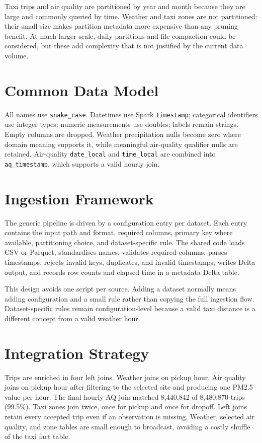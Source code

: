 \documentclass[11pt]{article}
\begin{document}
Taxi trips and air quality are partitioned by year and month because they are large and commonly queried by time. Weather and taxi zones are not partitioned: their small size makes partition metadata more expensive than any pruning benefit. At much larger scale, daily partitions and file compaction could be considered, but these add complexity that is not justified by the current data volume.

\section{Common Data Model}
All names use \texttt{snake\_case}. Datetimes use Spark \texttt{timestamp}; categorical identifiers use integer types; numeric measurements use doubles; labels remain strings. Empty columns are dropped. Weather precipitation nulls become zero where domain meaning supports it, while meaningful air-quality qualifier nulls are retained. Air-quality \texttt{date\_local} and \texttt{time\_local} are combined into \texttt{aq\_timestamp}, which supports a valid hourly join.

\section{Ingestion Framework}
The generic pipeline is driven by a configuration entry per dataset. Each entry contains the input path and format, required columns, primary key where available, partitioning choice, and dataset-specific rule. The shared code loads CSV or Parquet, standardises names, validates required columns, parses timestamps, rejects invalid keys, duplicates, and invalid timestamps, writes Delta output, and records row counts and elapsed time in a metadata Delta table.

This design avoids one script per source. Adding a dataset normally means adding configuration and a small rule rather than copying the full ingestion flow. Dataset-specific rules remain configuration-level because a valid taxi distance is a different concept from a valid weather hour.

\clearpage
\section{Integration Strategy}
Trips are enriched in four left joins. Weather joins on pickup hour. Air quality joins on pickup hour after filtering to the selected site and producing one PM2.5 value per hour. The final hourly AQ join matched 8,440,842 of 8,480,870 trips (99.5\%). Taxi zones join twice, once for pickup and once for dropoff. Left joins retain every accepted trip even if an observation is missing. Weather, selected air quality, and zone tables are small enough to broadcast, avoiding a costly shuffle of the taxi fact table.
\end{document}
